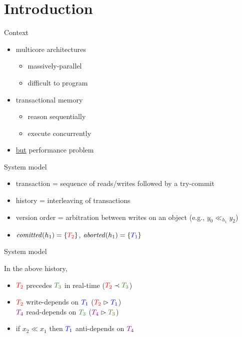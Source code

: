 \section{Introduction}

\begin{frame}{Context}
  \begin{itemize}
  \item multicore architectures
    \begin{itemize} 
    \item massively-parallel
    \item difficult to program
    \end{itemize}
  \item transactional memory
    \begin{itemize}
    \item reason sequentially
    \item execute concurrently
    \end{itemize}
  \item \underline{but} performance problem
  \end{itemize}
\end{frame}

\begin{frame}{System model}
  
  \bigskip
  \begin{itemize}
  \item transaction = sequence of reads/writes followed by a try-commit
  \item history = interleaving of transactions
  \item version order = arbitration between writes on an object (e.g., $y_0 \ll_{h_1} y_2$)
  \item $\committed{h_1}=\{\tTwo\}$, $\aborted{h_1}=\{\tOne\}$
  \end{itemize}
\end{frame}

\begin{frame}{System model}
  
  In the above history,\footnotemark
  \begin{itemize}
  \item $\tTwo$ precedes $\tThree$ in real-time ($\tTwo \hb \tThree$)
  \item $\tTwo$ write-depends on $\tOne$ ($\tTwo \depends \tOne$) \\
        $\tFour$ read-depends on $\tThree$ ($\tFour \depends \tThree$)
  \item if $x_2 \ll x_1$ then $\tOne$ anti-depends on $\tFour$ 
  \end{itemize}
  
\end{frame}

